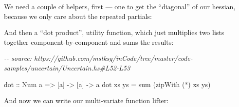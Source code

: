 \documentclass[]{article}
\newenvironment{Shaded}{}{}
\newcommand{\CommentTok}[1]{\textcolor[rgb]{0.38,0.63,0.69}{\textit{#1}}}
\newcommand{\DataTypeTok}[1]{\textcolor[rgb]{0.56,0.13,0.00}{#1}}
\newcommand{\DecValTok}[1]{\textcolor[rgb]{0.25,0.63,0.44}{#1}}
\newcommand{\FunctionTok}[1]{\textcolor[rgb]{0.02,0.16,0.49}{#1}}
\newcommand{\KeywordTok}[1]{\textcolor[rgb]{0.00,0.44,0.13}{\textbf{#1}}}
\newcommand{\NormalTok}[1]{#1}
\newcommand{\OperatorTok}[1]{\textcolor[rgb]{0.40,0.40,0.40}{#1}}
\newcommand{\OtherTok}[1]{\textcolor[rgb]{0.00,0.44,0.13}{#1}}
\begin{document}
We need a couple of helpers, first --- one to get the ``diagonal'' of our
hessian, because we only care about the repeated partials:

\begin{Shaded}
\end{Shaded}

And then a ``dot product'', utility function, which just multiplies two lists
together component-by-component and sums the results:

\begin{Shaded}
\begin{Highlighting}[]
\CommentTok{{-}{-} source: https://github.com/mstksg/inCode/tree/master/code{-}samples/uncertain/Uncertain.hs\#L52{-}L53}

\OtherTok{dot ::} \DataTypeTok{Num}\NormalTok{ a }\OtherTok{=>}\NormalTok{ [a] }\OtherTok{{-}>}\NormalTok{ [a] }\OtherTok{{-}>}\NormalTok{ a}
\NormalTok{dot xs ys }\OtherTok{=} \FunctionTok{sum}\NormalTok{ (}\FunctionTok{zipWith}\NormalTok{ (}\OperatorTok{*}\NormalTok{) xs ys)}
\end{Highlighting}
\end{Shaded}

And now we can write our multi-variate function lifter:
\end{document}
